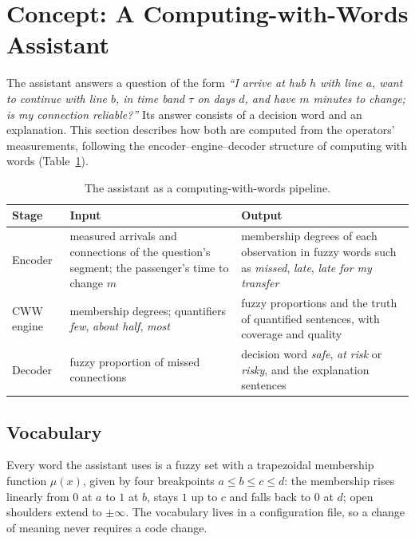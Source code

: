 \section{Concept: A Computing-with-Words Assistant}
\label{sec:concept}

The assistant answers a question of the form \emph{``I arrive at hub $h$ with line $a$, want
to continue with line $b$, in time band $\tau$ on days $d$, and have $m$ minutes to change;
is my connection reliable?''} Its answer consists of a decision word and an explanation. This
section describes how both are computed from the operators' measurements, following the
encoder--engine--decoder structure of computing with words (Table~\ref{tab:pipeline}).

\begin{table}[h]
  \caption{The assistant as a computing-with-words pipeline.}
  \label{tab:pipeline}
  \begin{tabular}{p{22mm}p{62mm}p{62mm}}
    \toprule
    Stage & Input & Output \\
    \midrule
    Encoder & measured arrivals and connections of the question's segment; the passenger's
    time to change $m$ & membership degrees of each observation in fuzzy words such as
    \emph{missed}, \emph{late}, \emph{late for my transfer} \\
    CWW engine & membership degrees; quantifiers \emph{few}, \emph{about half},
    \emph{most} & fuzzy proportions and the truth of quantified sentences, with coverage
    and quality \\
    Decoder & fuzzy proportion of missed connections & decision word \emph{safe},
    \emph{at risk} or \emph{risky}, and the explanation sentences \\
    \bottomrule
  \end{tabular}
\end{table}

\subsection{Vocabulary}
\label{sec:vocabulary}
Every word the assistant uses is a fuzzy set with a trapezoidal membership function
$\mu(x)$, given by four breakpoints $a \le b \le c \le d$: the membership rises linearly from
$0$ at $a$ to $1$ at $b$, stays $1$ up to $c$ and falls back to $0$ at $d$; open shoulders
extend to $\pm\infty$. The vocabulary lives in a configuration file, so a change of meaning
never requires a code change.


